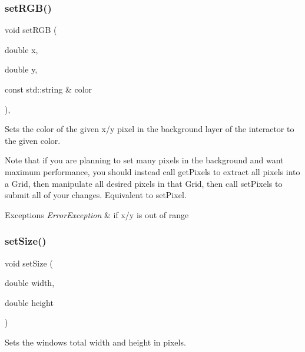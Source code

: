 \subsubsection{\texorpdfstring{set\+R\+G\+B()}{setRGB()}\hspace{0.1cm}{\footnotesize\ttfamily [3/3]}}
{\footnotesize\ttfamily void set\+R\+GB (\begin{DoxyParamCaption}\item[{double}]{x,  }\item[{double}]{y,  }\item[{const std\+::string \&}]{color }\end{DoxyParamCaption})\hspace{0.3cm}{\ttfamily [virtual]}, {\ttfamily [inherited]}}



Sets the color of the given x/y pixel in the background layer of the interactor to the given color. 

Note that if you are planning to set many pixels in the background and want maximum performance, you should instead call get\+Pixels to extract all pixels into a Grid, then manipulate all desired pixels in that Grid, then call set\+Pixels to submit all of your changes. Equivalent to set\+Pixel.


\begin{DoxyExceptions}{Exceptions}
{\em Error\+Exception} & if x/y is out of range \\
\hline
\end{DoxyExceptions}
\mbox{\label{classGWindow_aca25d49481f9bf5fc8f7df4c086c4ce7}} 
\subsubsection{\texorpdfstring{set\+Size()}{setSize()}\hspace{0.1cm}{\footnotesize\ttfamily [1/2]}}
{\footnotesize\ttfamily void set\+Size (\begin{DoxyParamCaption}\item[{double}]{width,  }\item[{double}]{height }\end{DoxyParamCaption})\hspace{0.3cm}{\ttfamily [virtual]}}



Sets the window\textquotesingle{}s total width and height in pixels. 

